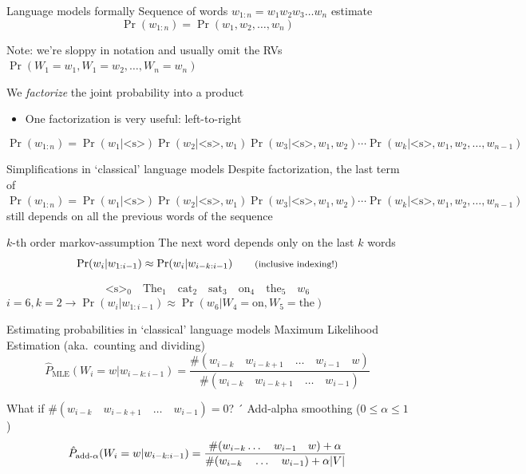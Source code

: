 \documentclass[12pt,aspectratio=169,handout]{beamer}
\begin{document}
\begin{frame}{Language models formally}
Sequence of words $w_{1:n} = w_1 w_2 w_3 \ldots w_n$ estimate
$$
\Pr(w_{1:n}) = \Pr(w_1, w_2, \ldots, w_n)
$$
\begin{block}{Note: we're sloppy in notation and usually omit the RVs}
$\Pr(W_1 = w_1, W_1 = w_2, \ldots, W_n = w_n)$
\end{block}

We \emph{factorize} the joint probability into a product
\begin{itemize}
	\item One factorization is very useful: left-to-right
\end{itemize}
$$
\Pr(w_{1:n}) = \Pr(w_1 | \text{<s>}) \Pr (w_2 | \text{<s>}, w_1) \Pr(w_3 | \text{<s>}, w_1, w_2) \cdots \Pr(w_k | \text{<s>}, w_1, w_2, \ldots, w_{n-1})
$$

\end{frame}

\begin{frame}{Simplifications in `classical' language models}
Despite factorization, the last term of
$
\Pr(w_{1:n}) = \Pr(w_1 | \text{<s>}) \Pr (w_2 | \text{<s>}, w_1) \Pr(w_3 | \text{<s>}, w_1, w_2) \cdots \Pr(w_k | \text{<s>}, w_1, w_2, \ldots, w_{n-1})
$
still depends on all the previous words of the sequence

\begin{block}{$k$-th order markov-assumption}
The next word depends only on the last $k$ words
$$
\Pr(w_{i} | w_{1:i-1}) \approx \Pr (w_{i} | w_{i-k:i-1}) \qquad \text{\footnotesize{(inclusive indexing!)}}
$$
\end{block}
\pause
$$
\text{<s>}_0 \quad \text{The}_1 \quad \text{cat}_2 \quad \text{sat}_3 \quad \text{on}_4 \quad \text{the}_5 \quad w_6
$$
$i = 6, k=2 \to \Pr(w_{i} | w_{1:i-1}) \approx \Pr(w_6 | W_4 = \text{on}, W_5 = \text{the})$
\end{frame}

\begin{frame}{Estimating probabilities in `classical' language models}
Maximum Likelihood Estimation (aka.\ counting and dividing)
$$
\hat{P}_{\text{MLE}}(W_i = w | w_{i - k:i - 1}) = \frac{\#(w_{i-k} \quad w_{i-k+1} \quad \ldots \quad w_{i-1} \quad w)}{\#(w_{i-k} \quad w_{i-k+1} \quad \ldots \quad w_{i-1})}
$$
\begin{block}{What if $\#(w_{i-k} \quad w_{i-k+1} \quad \ldots \quad w_{i-1}) = 0$?}
\pause´
Add-alpha smoothing ($0 \leq \alpha \leq 1$)
$$
\hat{P}_{\text{add-}\alpha}(W_i = w | w_{i - k:i - 1}) =
\frac{\#(w_{i-k} \ldots \quad w_{i-1} \quad w) + \alpha}
{\#(w_{i-k} \quad \ldots \quad w_{i-1}) + \alpha \abs{V}}
$$
\end{block}

\end{frame}
\end{document}
